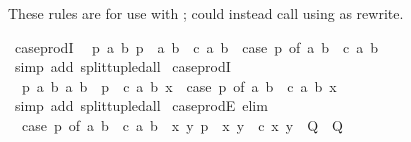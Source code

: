 \begin{isabellebody}
\begin{isamarkuptext}
  \medskip These rules are for use with ; could instead
  call  using  as rewrite.%
\end{isamarkuptext}\isamarkuptrue%
\isamarkupfalse%
\ case{\isacharunderscore}{\kern0pt}prodI{}{\isacharcolon}{\kern0pt}\isanewline
\ \ {\isachardoublequoteopen}{\isasymAnd}p{\isachardot}{\kern0pt}\ {\isacharparenleft}{\kern0pt}{\isasymAnd}a\ b{\isachardot}{\kern0pt}\ p\ {\isacharequal}{\kern0pt}\ {\isacharparenleft}{\kern0pt}a{\isacharcomma}{\kern0pt}\ b{\isacharparenright}{\kern0pt}\ {\isasymLongrightarrow}\ c\ a\ b{\isacharparenright}{\kern0pt}\ {\isasymLongrightarrow}\ case\ p\ of\ {\isacharparenleft}{\kern0pt}a{\isacharcomma}{\kern0pt}\ b{\isacharparenright}{\kern0pt}\ {\isasymRightarrow}\ c\ a\ b{\isachardoublequoteclose}\isanewline
%
\isadelimproof
\ \ %
\endisadelimproof
%
\isatagproof
{}\isamarkupfalse%
\ {\isacharparenleft}{\kern0pt}simp\ add{\isacharcolon}{\kern0pt}\ split{\isacharunderscore}{\kern0pt}tupled{\isacharunderscore}{\kern0pt}all{\isacharparenright}{\kern0pt}%
\endisatagproof
{\isafoldproof}%
%
\isadelimproof
\isanewline
%
\endisadelimproof
\isanewline
{}\isamarkupfalse%
\ case{\isacharunderscore}{\kern0pt}prodI{}{\isacharprime}{\kern0pt}{\isacharcolon}{\kern0pt}\isanewline
\ \ {\isachardoublequoteopen}{\isasymAnd}p{\isachardot}{\kern0pt}\ {\isacharparenleft}{\kern0pt}{\isasymAnd}a\ b{\isachardot}{\kern0pt}\ {\isacharparenleft}{\kern0pt}a{\isacharcomma}{\kern0pt}\ b{\isacharparenright}{\kern0pt}\ {\isacharequal}{\kern0pt}\ p\ {\isasymLongrightarrow}\ c\ a\ b\ x{\isacharparenright}{\kern0pt}\ {\isasymLongrightarrow}\ {\isacharparenleft}{\kern0pt}case\ p\ of\ {\isacharparenleft}{\kern0pt}a{\isacharcomma}{\kern0pt}\ b{\isacharparenright}{\kern0pt}\ {\isasymRightarrow}\ c\ a\ b{\isacharparenright}{\kern0pt}\ x{\isachardoublequoteclose}\isanewline
%
\isadelimproof
\ \ %
\endisadelimproof
%
\isatagproof
{}\isamarkupfalse%
\ {\isacharparenleft}{\kern0pt}simp\ add{\isacharcolon}{\kern0pt}\ split{\isacharunderscore}{\kern0pt}tupled{\isacharunderscore}{\kern0pt}all{\isacharparenright}{\kern0pt}%
\endisatagproof
{\isafoldproof}%
%
\isadelimproof
\isanewline
%
\endisadelimproof
\isanewline
{}\isamarkupfalse%
\ case{\isacharunderscore}{\kern0pt}prodE\ {\isacharbrackleft}{\kern0pt}elim{\isacharbang}{\kern0pt}{\isacharbrackright}{\kern0pt}{\isacharcolon}{\kern0pt}\isanewline
\ \ {\isachardoublequoteopen}{\isacharparenleft}{\kern0pt}case\ p\ of\ {\isacharparenleft}{\kern0pt}a{\isacharcomma}{\kern0pt}\ b{\isacharparenright}{\kern0pt}\ {\isasymRightarrow}\ c\ a\ b{\isacharparenright}{\kern0pt}\ {\isasymLongrightarrow}\ {\isacharparenleft}{\kern0pt}{\isasymAnd}x\ y{\isachardot}{\kern0pt}\ p\ {\isacharequal}{\kern0pt}\ {\isacharparenleft}{\kern0pt}x{\isacharcomma}{\kern0pt}\ y{\isacharparenright}{\kern0pt}\ {\isasymLongrightarrow}\ c\ x\ y\ {\isasymLongrightarrow}\ Q{\isacharparenright}{\kern0pt}\ {\isasymLongrightarrow}\ Q{\isachardoublequoteclose}\isanewline

\end{isabellebody}
